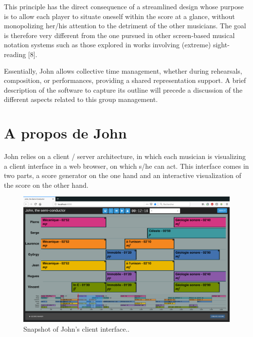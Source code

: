 This principle has the direct consequence of a streamlined design whose purpose is to allow each player to situate oneself within the score at a glance, without monopolizing her/his attention to the detriment of the other musicians. The goal is therefore very different from the one pursued in other screen-based musical notation systems such as those explored in works involving (extreme) sight-reading [8].

Essentially, John allows collective time management, whether during rehearsals, composition, or performances, providing a shared representation support. A brief description of the software to capture its outline will precede a discussion of the different aspects related to this group management.

\section{A propos de John}
John relies on a client / server architecture, in which each musician is visualizing a client interface in a web browser, on which s/he can act. This interface comes in two parts, a score generator on the one hand and an interactive visualization of the score on the other hand.

\begin{figure}[htb]
	\includegraphics[width=\textwidth]{gfx/notation/John-snapshot.png}
	\caption{Snapshot of John's client interface..}
	\label{fig:notation:john-snapshot}
\end{figure}

